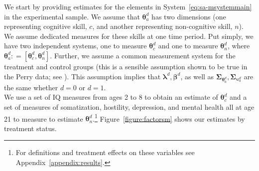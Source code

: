 \noindent We start by providing estimates for the elements in System~\eqref{eq:sa-msystemmain} in the experimental sample. We assume that $\bm{\theta}_{a}^d$ has two dimensions (one representing cognitive skill, $c$, and another representing non-cognitive skill, $n$). We assume dedicated measures for these skills at one time period. Put simply, we have two independent systems, one to measure $\bm{\theta}_{c}^d$ and one to measure $\bm{\theta}_{n}^d$, where $\bm{\theta}_{a}^d: = \left[ \bm{\theta}_{c}^d, \bm{\theta}_{n}^d \right]$. Further, we assume a common measurement system for the treatment and control groups (this is a sensible assumption shown to be true in the Perry data; see \citealp{Heckman_Pinto_etal_2013_PerryFactor}). This assumption implies that $\bm{\lambda}^d, \bm{\beta}^d$, as well as $\bm{\Sigma}_{\bm{\theta}_{a}^d}, \bm{\Sigma}_{\bm{\upsilon}_{a}^d}$ are the same whether $d = 0$ or $d = 1$.\\

\noindent We use a set of IQ measures from ages 2 to 8 to obtain an estimate of $\bm{\theta}_{c}^d$ and a set of measures of somatization, hostility, depression, and mental health all at age 21 to measure to estimate $\bm{\theta}_{n}^d$.\footnote{For definitions and treatment effects on these variables see Appendix~\ref{appendix:results}.} Figure~\ref{figure:factorsm} shows our estimates by treatment status.\\

